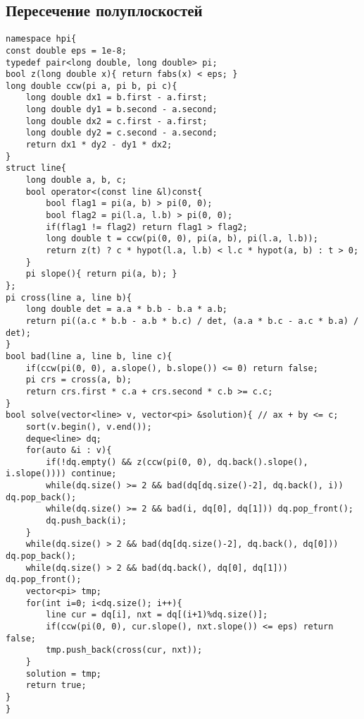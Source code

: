 \documentclass[14pt,fleqn]{article}
\begin{document}
\subsection{Пересечение полуплоскостей}
\begin{Verbatim}[tabsize=4]
namespace hpi{
const double eps = 1e-8;
typedef pair<long double, long double> pi;
bool z(long double x){ return fabs(x) < eps; }
long double ccw(pi a, pi b, pi c){
	long double dx1 = b.first - a.first;
	long double dy1 = b.second - a.second;
	long double dx2 = c.first - a.first;
	long double dy2 = c.second - a.second;
	return dx1 * dy2 - dy1 * dx2;
}
struct line{
	long double a, b, c;
	bool operator<(const line &l)const{
		bool flag1 = pi(a, b) > pi(0, 0);
		bool flag2 = pi(l.a, l.b) > pi(0, 0);
		if(flag1 != flag2) return flag1 > flag2;
		long double t = ccw(pi(0, 0), pi(a, b), pi(l.a, l.b));
		return z(t) ? c * hypot(l.a, l.b) < l.c * hypot(a, b) : t > 0;
	}
	pi slope(){ return pi(a, b); }
};
pi cross(line a, line b){
	long double det = a.a * b.b - b.a * a.b;
	return pi((a.c * b.b - a.b * b.c) / det, (a.a * b.c - a.c * b.a) / det);
}
bool bad(line a, line b, line c){
	if(ccw(pi(0, 0), a.slope(), b.slope()) <= 0) return false;
	pi crs = cross(a, b);
	return crs.first * c.a + crs.second * c.b >= c.c;
}
bool solve(vector<line> v, vector<pi> &solution){ // ax + by <= c;
	sort(v.begin(), v.end());
	deque<line> dq;
	for(auto &i : v){
		if(!dq.empty() && z(ccw(pi(0, 0), dq.back().slope(), i.slope()))) continue;
		while(dq.size() >= 2 && bad(dq[dq.size()-2], dq.back(), i)) dq.pop_back();
		while(dq.size() >= 2 && bad(i, dq[0], dq[1])) dq.pop_front();
		dq.push_back(i);
	}
	while(dq.size() > 2 && bad(dq[dq.size()-2], dq.back(), dq[0])) dq.pop_back();
	while(dq.size() > 2 && bad(dq.back(), dq[0], dq[1])) dq.pop_front();
	vector<pi> tmp;
	for(int i=0; i<dq.size(); i++){
		line cur = dq[i], nxt = dq[(i+1)%dq.size()];
		if(ccw(pi(0, 0), cur.slope(), nxt.slope()) <= eps) return false;
		tmp.push_back(cross(cur, nxt));
	}
	solution = tmp;
	return true;
}
}
\end{Verbatim}

\pagebreak
\end{document}
